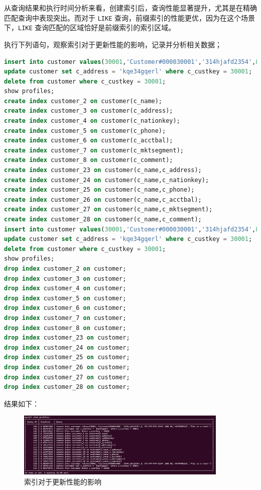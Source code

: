 \documentclass{article}
\renewcommand\tt{\texttt}
\begin{document}
从查询结果和执行时间分析来看，创建索引后，查询性能显著提升，尤其是在精确匹配查询中表现突出。而对于 \tt{LIKE} 查询，前缀索引的性能更优，因为在这个场景下，\tt{LIKE} 查询匹配的区域恰好是前缀索引的索引区域。

执行下列语句，观察索引对于更新性能的影响，记录并分析相关数据；

\begin{lstlisting}[language=sql]
insert into customer values(30001,'Customer#000030001','314hjafd2354',8,'27-147-574-1234',888.88,'AUTOMOBILE','This is a test!');
update customer set c_address = 'kqe34gqerl' where c_custkey = 30001;
delete from customer where c_custkey = 30001;
show profiles;
create index customer_2 on customer(c_name);
create index customer_3 on customer(c_address);
create index customer_4 on customer(c_nationkey);
create index customer_5 on customer(c_phone);
create index customer_6 on customer(c_acctbal);
create index customer_7 on customer(c_mktsegment);
create index customer_8 on customer(c_comment);
create index customer_23 on customer(c_name,c_address);
create index customer_24 on customer(c_name,c_nationkey);
create index customer_25 on customer(c_name,c_phone);
create index customer_26 on customer(c_name,c_acctbal);
create index customer_27 on customer(c_name,c_mktsegment);
create index customer_28 on customer(c_name,c_comment);
insert into customer values(30001,'Customer#000030001','314hjafd2354',8,'27-147-574-1234',888.88,'AUTOMOBILE','This is a test!');
update customer set c_address = 'kqe34gqerl' where c_custkey = 30001;
delete from customer where c_custkey = 30001;
show profiles;
drop index customer_2 on customer;
drop index customer_3 on customer;
drop index customer_4 on customer;
drop index customer_5 on customer;
drop index customer_6 on customer;
drop index customer_7 on customer;
drop index customer_8 on customer;
drop index customer_23 on customer;
drop index customer_24 on customer;
drop index customer_25 on customer;
drop index customer_26 on customer;
drop index customer_27 on customer;
drop index customer_28 on customer;
\end{lstlisting}

结果如下：

\begin{figure}[H]
\centering
\includegraphics[width=0.9\textwidth]{img/19.png}
\caption{索引对于更新性能的影响}
\end{figure}
\end{document}
